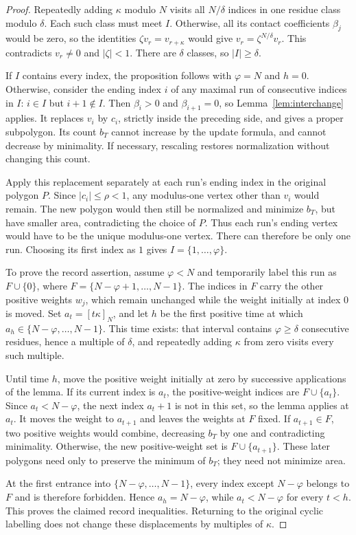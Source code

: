 \documentclass[11pt,a4paper]{article}
\theoremstyle{definition}
\theoremstyle{remark}
\numberwithin{equation}{section}
\begin{document}
\begin{proof}
Repeatedly adding $\kappa$ modulo $N$ visits all $N/\delta$ indices in one residue class modulo $\delta$. Each such class must meet $I$. Otherwise, all its contact coefficients $\beta_j$ would be zero, so the identities $\zeta v_r=v_{r+\kappa}$ would give $v_r=\zeta^{N/\delta}v_r$. This contradicts $v_r\ne0$ and $|\zeta|<1$. There are $\delta$ classes, so $|I|\ge\delta$.

If $I$ contains every index, the proposition follows with $\varphi=N$ and $h=0$. Otherwise, consider the ending index $i$ of any maximal run of consecutive indices in $I$: $i\in I$ but $i+1\notin I$. Then $\beta_i>0$ and $\beta_{i+1}=0$, so Lemma~\ref{lem:interchange} applies. It replaces $v_i$ by $c_i$, strictly inside the preceding side, and gives a proper subpolygon. Its count $b_T$ cannot increase by the update formula, and cannot decrease by minimality. If necessary, rescaling restores normalization without changing this count.

Apply this replacement separately at each run's ending index in the original polygon $P$. Since $|c_i|\le\rho<1$, any modulus-one vertex other than $v_i$ would remain. The new polygon would then still be normalized and minimize $b_T$, but have smaller area, contradicting the choice of $P$. Thus each run's ending vertex would have to be the unique modulus-one vertex. There can therefore be only one run. Choosing its first index as $1$ gives $I=\{1,\ldots,\varphi\}$.

To prove the record assertion, assume $\varphi<N$ and temporarily label this run as $F\cup\{0\}$, where $F=\{N-\varphi+1,\ldots,N-1\}$. The indices in $F$ carry the other positive weights $w_j$, which remain unchanged while the weight initially at index $0$ is moved. Set $a_t=[t\kappa]_N$, and let $h$ be the first positive time at which $a_h\in\{N-\varphi,\ldots,N-1\}$. This time exists: that interval contains $\varphi\ge\delta$ consecutive residues, hence a multiple of $\delta$, and repeatedly adding $\kappa$ from zero visits every such multiple.

Until time $h$, move the positive weight initially at zero by successive applications of the lemma. If its current index is $a_t$, the positive-weight indices are $F\cup\{a_t\}$. Since $a_t<N-\varphi$, the next index $a_t+1$ is not in this set, so the lemma applies at $a_t$. It moves the weight to $a_{t+1}$ and leaves the weights at $F$ fixed. If $a_{t+1}\in F$, two positive weights would combine, decreasing $b_T$ by one and contradicting minimality. Otherwise, the new positive-weight set is $F\cup\{a_{t+1}\}$. These later polygons need only to preserve the minimum of $b_T$; they need not minimize area.

At the first entrance into $\{N-\varphi,\ldots,N-1\}$, every index except $N-\varphi$ belongs to $F$ and is therefore forbidden. Hence $a_h=N-\varphi$, while $a_t<N-\varphi$ for every $t<h$. This proves the claimed record inequalities. Returning to the original cyclic labelling does not change these displacements by multiples of $\kappa$.
\end{proof}
\end{document}
